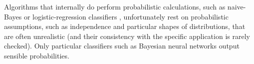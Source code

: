 \documentclass[\ifafour a4paper,12pt,\else a5paper,10pt,\fi%
onecolumn,oneside,article,%
british%
]{memoir}
\theoremstyle{remark}
\theoremstyle{innote}
\renewcommand*{\|}[1][]{\nonscript\:#1\vert\nonscript\:\mathopen{}}
\newcommand*{\sect}{\S}%
\newcommand*{\sects}{\S\S}%
\newcommand*{\chap}{ch.}%
\newcommand*{\chaps}{chs}%
\newcommand*{\puzzle}{{\fontencoding{U}\fontfamily{fontawesometwo}\selectfont\symbol{225}}}
\newcommand{\mynote}[1]{ {\color{notecolour}#1}}
\newcommand*{\ml}{machine-learning}
\begin{document}
Algorithms that internally do perform probabilistic calculations, such as naive-Bayes or logistic-regression classifiers \autocites[\sect~3.5, \chap~8]{murphy2012}[\sects~8.2, 4.3]{bishop2006}[\chap~10, \sect~17.4]{barber2007_r2020}, unfortunately rest on probabilistic assumptions, such as independence and particular shapes of distributions, that are often unrealistic (and their consistency with the specific application is rarely checked). Only particular classifiers such as Bayesian neural networks \autocites{nealetal2006}[\sect~5.7]{bishop2006} output sensible probabilities.

% 
\end{document}
